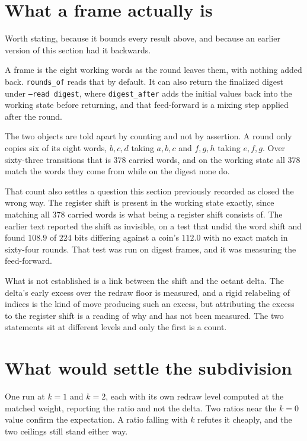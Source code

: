\section{What a frame actually is}

Worth stating, because it bounds every result above, and because an earlier version of this section had it backwards.

A frame is the eight working words as the round leaves them, with nothing added back. \texttt{rounds\_of} reads that by default. It can also return the finalized digest under \texttt{--read digest}, where \texttt{digest\_after} adds the initial values back into the working state before returning, and that feed-forward is a mixing step applied after the round.

The two objects are told apart by counting and not by assertion. A round only copies six of its eight words, \(b,c,d\) taking \(a,b,c\) and \(f,g,h\) taking \(e,f,g\). Over sixty-three transitions that is \(378\) carried words, and on the working state all \(378\) match the words they come from while on the digest none do.

That count also settles a question this section previously recorded as closed the wrong way. The register shift is present in the working state exactly, since matching all \(378\) carried words is what being a register shift consists of. The earlier text reported the shift as invisible, on a test that undid the word shift and found \(108.9\) of \(224\) bits differing against a coin's \(112.0\) with no exact match in sixty-four rounds. That test was run on digest frames, and it was measuring the feed-forward.

What is not established is a link between the shift and the octant delta. The delta's early excess over the redraw floor is measured, and a rigid relabeling of indices is the kind of move producing such an excess, but attributing the excess to the register shift is a reading of why and has not been measured. The two statements sit at different levels and only the first is a count.

\section{What would settle the subdivision}

One run at \(k = 1\) and \(k = 2\), each with its own redraw level computed at the matched weight, reporting the ratio and not the delta. Two ratios near the \(k = 0\) value confirm the expectation. A ratio falling with \(k\) refutes it cheaply, and the two ceilings still stand either way.

